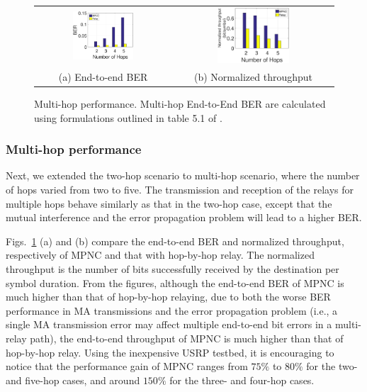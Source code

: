 \begin{figure} 
\centering
\begin{tabular}{cc}
   \hspace*{-12pt} \includegraphics[width=0.47\textwidth]{figures/ber_bar_160}&
   \hspace*{-12pt}\includegraphics[width=0.47\textwidth]{figures/th_bar_160}\\
      \hspace*{-12pt} (a) End-to-end BER &
 \hspace*{-12pt} (b) Normalized throughput
      \end{tabular}
       \caption{Multi-hop performance. Multi-hop End-to-End BER are calculated using formulations outlined in table 5.1 of \cite{zhang2017cross}.} %
    \label{fig:experiment_ber}
\end{figure}

\subsubsection{Multi-hop performance}
Next, we extended the two-hop scenario to multi-hop scenario, where the number of hops varied from two to five. The transmission and reception of the relays for multiple hops behave similarly as that in the two-hop case, except that the mutual interference  and the error propagation problem will lead to a higher BER.

Figs.~\ref{fig:experiment_ber} (a) and (b) compare the end-to-end BER and normalized throughput, respectively of MPNC and that with hop-by-hop relay. 
The normalized throughput is the number of bits successfully received by the destination per symbol duration. 
From the figures, although the end-to-end BER of MPNC is much higher than that of hop-by-hop relaying, due to both the worse BER performance in MA transmissions and the error propagation problem (i.e., a single MA transmission error may affect multiple end-to-end bit errors in a multi-relay path),  the end-to-end throughput of MPNC is much higher
than that of hop-by-hop relay. Using the inexpensive USRP testbed, it is encouraging to notice that the performance gain of MPNC ranges from $75\%$ to $80\%$ for the two- and five-hop cases, and around $150\%$ for the three- and four-hop cases. 


